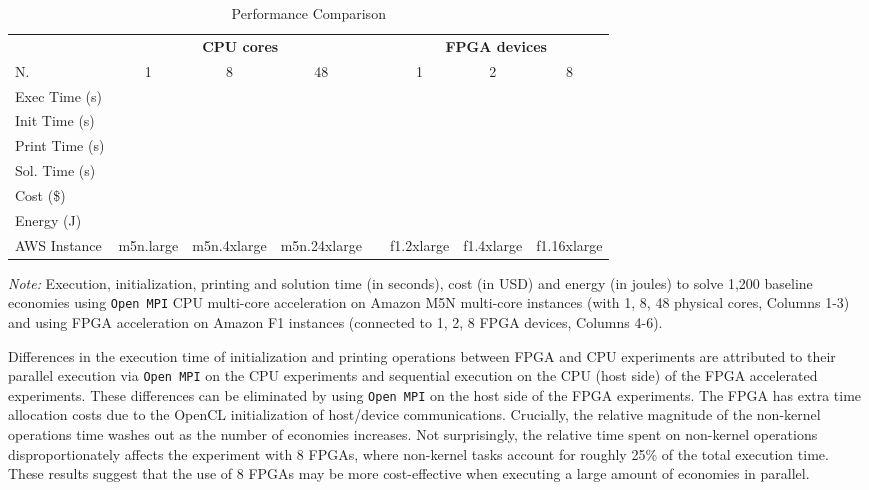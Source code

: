 \documentclass[12pt,american]{article}
\makeatletter
\newcommand{\resultsfolder}{./results}
\newcommand{\devfpgaI}{fpgaI}
\newcommand{\devfpgaII}{fpgaII}
\newcommand{\devfpgaIII}{fpgaIII}
\newcommand{\devcpu}{cpu-cores}
\newcommand{\nKMIkI}{nKM4-nk100}
\newcommand{\cpuI}{m5n.large\@\xspace}
\newcommand{\cpucoreI}{1}
\newcommand{\cpuII}{m5n.4xlarge\@\xspace}
\newcommand{\cpucoreII}{8}
\newcommand{\cpuIII}{m5n.24xlarge\@\xspace}
\newcommand{\cpucoreIII}{48}
\newcommand{\awsinstfI}{f1.2xlarge\@\xspace}
\newcommand{\awsinstfII}{f1.4xlarge\@\xspace}
\newcommand{\awsinstfIII}{f1.16xlarge\@\xspace}
\newcommand{\cpuItimetot}{}
\newcommand{\cpuIinittime}{}
\newcommand{\cpuIwritetime}{}
\newcommand{\cpuItime}{}
\newcommand{\cpuIcost}{}
\newcommand{\cpuIenergy}{}
\newcommand{\cpuIItimetot}{}
\newcommand{\cpuIIinittime}{}
\newcommand{\cpuIIwritetime}{}
\newcommand{\cpuIItime}{}
\newcommand{\cpuIIcost}{}
\newcommand{\cpuIIenergy}{}
\newcommand{\cpuIIItimetot}{}
\newcommand{\cpuIIIinittime}{}
\newcommand{\cpuIIIwritetime}{}
\newcommand{\cpuIIItime}{}
\newcommand{\cpuIIIcost}{}
\newcommand{\cpuIIIenergy}{}
\newcommand{\fpgaItimetot}{}
\newcommand{\fpgaIinittime}{}
\newcommand{\fpgaIwritetime}{}
\newcommand{\fpgaItime}{}
\newcommand{\fpgaIcost}{}
\newcommand{\fpgaIenergy}{}
\newcommand{\fpgaIItimetot}{}
\newcommand{\fpgaIIinittime}{}
\newcommand{\fpgaIIwritetime}{}
\newcommand{\fpgaIItime}{}
\newcommand{\fpgaIIcost}{}
\newcommand{\fpgaIIenergy}{}
\newcommand{\fpgaIIItimetot}{}
\newcommand{\fpgaIIIinittime}{}
\newcommand{\fpgaIIIwritetime}{}
\newcommand{\fpgaIIItime}{}
\newcommand{\fpgaIIIcost}{}
\newcommand{\fpgaIIIenergy}{}
\newcommand{\numbeconII}{1,200\@\xspace}
\newcommand{\fpgaIIIlossExecvsKernelTime}{25}
\makeatother
\begin{document}
\begin{table}[ht!]
\caption{Performance Comparison}\label{tab:perf_comp}
\vspace{-0.2in}
\hspace{-1.8cm} 
\begin{center}
\begin{tabular}{lccccccc}
\toprule
&\multicolumn{3}{c}{\textbf{CPU cores}}&&\multicolumn{3}{c}{\textbf{FPGA devices}}\\
\cmidrule{2-4}\cmidrule{6-8}
N.    &1&8&48&&1&2&8\\
\cmidrule{2-4}\cmidrule{6-8}
Exec Time (s) &\cpuItimetot &\cpuIItimetot &\cpuIIItimetot && \fpgaItimetot &\fpgaIItimetot &\fpgaIIItimetot\\
Init Time (s) &\cpuIinittime &\cpuIIinittime &\cpuIIIinittime&&  \fpgaIinittime&\fpgaIIinittime&\fpgaIIIinittime\\         
Print Time (s) &\cpuIwritetime &\cpuIIwritetime &\cpuIIIwritetime&& \fpgaIwritetime&\fpgaIIwritetime&\fpgaIIIwritetime\\     
Sol. Time (s) &\cpuItime &\cpuIItime &\cpuIIItime&& \fpgaItime&\fpgaIItime&\fpgaIIItime\\
Cost (\$) & \cpuIcost & \cpuIIcost &\cpuIIIcost && \fpgaIcost&\fpgaIIcost&\fpgaIIIcost\\
Energy (J) & \cpuIenergy& \cpuIIenergy &\cpuIIIenergy&& \fpgaIenergy&\fpgaIIenergy&\fpgaIIIenergy\\
\cmidrule{2-8}
AWS Instance & \cpuI & \cpuII  & \cpuIII &&\awsinstfI&\awsinstfII&\awsinstfIII \\  
\bottomrule         
\end{tabular}
\end{center}
\small
\textit{Note:} Execution, initialization, printing and solution time (in seconds), cost (in USD) and energy (in joules) to solve \numbeconII baseline economies using \texttt{Open MPI} CPU multi-core acceleration on Amazon M5N multi-core instances (with 1, 8, 48 physical cores, Columns 1-3) and using FPGA acceleration on Amazon F1 instances (connected to 1, 2, 8 FPGA devices, Columns 4-6). 
\end{table}

Differences in the execution time of initialization and printing operations between FPGA and CPU experiments are attributed to their parallel execution via \texttt{Open MPI} on the CPU experiments and sequential execution on the CPU (host side) of the FPGA accelerated experiments. These differences can be eliminated by using \texttt{Open MPI} on the host side of the FPGA experiments. The FPGA has extra time allocation costs due to the OpenCL initialization of host/device communications. Crucially, the relative magnitude of the non-kernel operations time washes out as the number of economies increases. Not surprisingly, the relative time spent on non-kernel operations disproportionately affects the experiment with 8 FPGAs, where non-kernel tasks account for roughly \fpgaIIIlossExecvsKernelTime\% of the total execution time. These results suggest that the use of 8 FPGAs may be more cost-effective when executing a large amount of economies in parallel.
\end{document}
